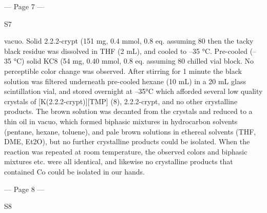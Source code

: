 --- Page 7 ---
 
 
S7 
 
 
vacuo. Solid 2.2.2-crypt (151 mg, 0.4 mmol, 0.8 eq. assuming 80%
then the tacky black residue was dissolved in THF (2 mL), and cooled to –35 °C. Pre-cooled (–35 °C) solid KC8 (54 mg, 0.40 
mmol, 0.8 eq. assuming 80%
chilled vial block. No perceptible color change was observed. After stirring for 1 minute the black solution was filtered 
underneath pre-cooled hexane (10 mL) in a 20 mL glass scintillation vial, and stored overnight at –35°C which afforded several 
low quality crystals of [K(2.2.2-crypt)][TMP] (8), 2.2.2-crypt, and no other crystalline products. The brown solution was 
decanted from the crystals and reduced to a thin oil in vacuo, which formed biphasic mixtures in hydrocarbon solvents (pentane, 
hexane, toluene), and pale brown solutions in ethereal solvents (THF, DME, Et2O), but no further crystalline products could 
be isolated. When the reaction was repeated at room temperature, the observed colors and biphasic mixtures etc. were all 
identical, and likewise no crystalline products that contained Co could be isolated in our hands. 
 
 


--- Page 8 ---
 
 
S8 
 
